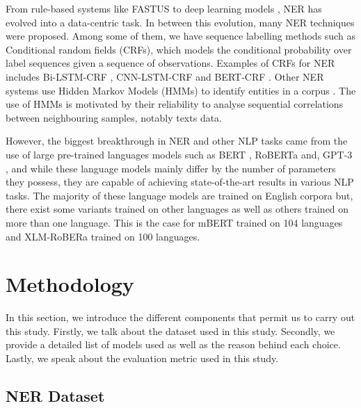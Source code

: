 \documentclass[11pt,a4paper]{article}
\begin{document}
From rule-based systems like FASTUS \cite{appelt-etal-1995-sri} to deep learning models \cite{DBLP:journals/corr/abs-1812-09449}, NER has evolved into a data-centric task. In between this evolution, many NER techniques were proposed. Among some of them, we have sequence labelling methods such as Conditional random fields (CRFs), which models the conditional probability over label sequences given a sequence of observations. Examples of CRFs for NER includes Bi-LSTM-CRF \cite{DBLP:journals/corr/HuangXY15}, CNN-LSTM-CRF \cite{DBLP:journals/corr/abs-1905-01964} and BERT-CRF \cite{DBLP:journals/corr/abs-1909-10649}. Other NER systems use Hidden Markov Models (HMMs) to identify entities in a corpus \cite{10.1007/978-3-540-77046-6_67}. The use of HMMs is motivated by their reliability to analyse sequential correlations between neighbouring samples, notably texts data.

However, the biggest breakthrough in NER and other NLP tasks came from the use of large pre-trained languages models such as BERT  \cite{DBLP:journals/corr/abs-1810-04805}, RoBERTa \cite{DBLP:journals/corr/abs-1907-11692} and, GPT-3 \cite{DBLP:journals/corr/abs-2005-14165}, and while these language models mainly differ by the number of parameters they possess, they are capable of achieving state-of-the-art results in various NLP tasks. The majority of these language models are trained on English corpora but, there exist some variants trained on other languages \cite{DBLP:journals/corr/abs-1911-03894, DBLP:journals/corr/abs-2012-02110, CaneteCFP2020} as well as others trained on more than one language. This is the case for mBERT \cite{DBLP:journals/corr/abs-1911-03310} trained on 104 languages and XLM-RoBERa \cite{DBLP:journals/corr/abs-1901-07291} trained on 100 languages.

\section{Methodology}
\label{sec:met}

In this section, we introduce the different components that permit us to carry out this study. Firstly, we talk about the dataset used in this study. Secondly, we provide a detailed list of models used as well as the reason behind each choice. Lastly, we speak about the evaluation metric used in this study.

\subsection{NER Dataset}
\end{document}
